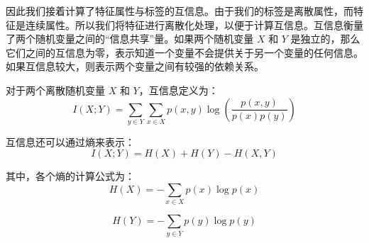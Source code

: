   
  因此我们接着计算了特征属性与标签的互信息。由于我们的标签是离散属性，而特征是连续属性。所以我们将特征进行离散化处理，以便于计算互信息。互信息衡量了两个随机变量之间的“信息共享”量。如果两个随机变量 $X$ 和 $Y$ 是独立的，那么它们之间的互信息为零，表示知道一个变量不会提供关于另一个变量的任何信息。如果互信息较大，则表示两个变量之间有较强的依赖关系。
 
对于两个离散随机变量 \(X\) 和 \(Y\)，互信息定义为：
\begin{equation}
I(X; Y) = \sum_{y \in Y} \sum_{x \in X} p(x, y) \log \left(\frac{p(x, y)}{p(x) p(y)}\right)
\label{eq:mutual_information}
\end{equation}

互信息还可以通过熵来表示：
\begin{equation}
I(X; Y) = H(X) + H(Y) - H(X, Y)
\label{eq:mutual_information_entropy}
\end{equation}

其中，各个熵的计算公式为：
\begin{equation}
H(X) = -\sum_{x \in X} p(x) \log p(x)
\label{eq:entropy_x}
\end{equation}

\begin{equation}
H(Y) = -\sum_{y \in Y} p(y) \log p(y)
\label{eq:entropy_y}
\end{equation}

